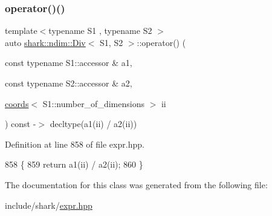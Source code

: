 \subsubsection{\texorpdfstring{operator()()}{operator()()}}
{\footnotesize\ttfamily template$<$typename S1 , typename S2 $>$ \\
auto \hyperlink{classshark_1_1ndim_1_1_div}{shark\+::ndim\+::\+Div}$<$ S1, S2 $>$\+::operator() (\begin{DoxyParamCaption}\item[{const typename S1\+::accessor \&}]{a1,  }\item[{const typename S2\+::accessor \&}]{a2,  }\item[{\hyperlink{structshark_1_1ndim_1_1coords}{coords}$<$ S1\+::number\+\_\+of\+\_\+dimensions $>$}]{ii }\end{DoxyParamCaption}) const -\/$>$ decltype(a1(ii) / a2(ii)) \hspace{0.3cm}{\ttfamily [inline]}}



Definition at line 858 of file expr.\+hpp.


\begin{DoxyCode}
858                                                                                                            
                                                           \{
859                 \textcolor{keywordflow}{return} a1(ii) / a2(ii);
860             \}
\end{DoxyCode}


The documentation for this class was generated from the following file\+:\begin{DoxyCompactItemize}
\item 
include/shark/\hyperlink{expr_8hpp}{expr.\+hpp}\end{DoxyCompactItemize}
